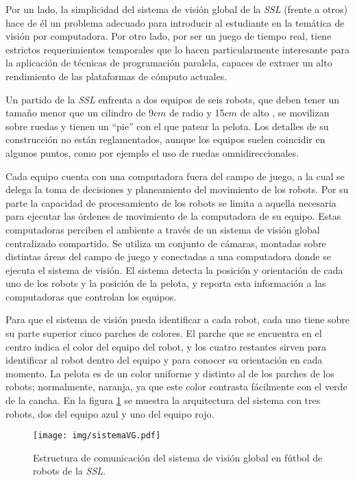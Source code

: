 Por un lado, la simplicidad del sistema de visión global de la \emph{SSL}
(frente a otros) hace de él un problema adecuado para introducir al estudiante
en la temática de visión por computadora. Por otro lado, por ser un juego de
tiempo real, tiene estrictos requerimientos temporales que lo hacen
particularmente interesante para la aplicación de técnicas de programación
paralela, capaces de extraer un alto rendimiento de las plataformas de cómputo
actuales.

Un partido de la \emph{SSL} enfrenta a dos equipos de seis robots, que deben
tener un tamaño menor que un cilindro de 9$cm$ de radio y 15$cm$ de alto
\cite{sslrules2015}, se movilizan sobre ruedas y tienen un ``pie'' con el que
patear la pelota. Los detalles de su construcción no están reglamentados,
aunque los equipos suelen coincidir en algunos puntos, como por ejemplo el uso
de ruedas omnidireccionales.

Cada equipo cuenta con una computadora fuera del campo de juego, a la cual se
delega la toma de decisiones y planeamiento del movimiento de los robots. Por
su parte la capacidad de procesamiento de los robots se limita a aquella
necesaria para ejecutar las órdenes de movimiento de la computadora de su
equipo. Estas computadoras perciben el ambiente a través de un sistema de
visión global centralizado compartido. Se utiliza un conjunto de cámaras,
montadas sobre distintas áreas del campo de juego y conectadas a una
computadora donde se ejecuta el sistema de visión. El sistema detecta la
posición y orientación de cada uno de los robots y la posición de la pelota, y
reporta esta información a las computadoras que controlan los equipos.

Para que el sistema de visión pueda identificar a cada robot, cada uno tiene
sobre su parte superior cinco parches de colores. El parche que se encuentra en
el centro indica el color del equipo del robot, y los cuatro restantes sirven
para identificar al robot dentro del equipo y para conocer su orientación en
cada momento. La pelota es de un color uniforme y distinto al de los parches de
los robots; normalmente, naranja, ya que este color contrasta fácilmente con el
verde de la cancha. En la figura \ref{sistemaVG} se muestra la arquitectura del
sistema con tres robots, dos del equipo azul y uno del equipo rojo.

\begin{figure}[!htb]

	\texttt{[image: img/sistemaVG.pdf]}

	\caption{Estructura de comunicación del sistema de visión global en
	fútbol de robots de la \emph{SSL}.}

	\label{sistemaVG}

\end{figure}

